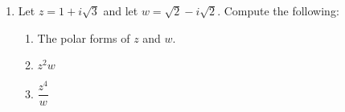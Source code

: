 \documentclass[12pt]{article}
\begin{document}
\begin{enumerate}
 \item Let $z = 1+i\sqrt{3}$ and let $w = \sqrt{2}-i\sqrt{2}$. Compute the following:
\begin{enumerate}
 \item The polar forms of $z$ and $w$.

\vspace{4cm}


 \item $z^2w$ 

\vspace{2.25cm}

 \item $\dfrac{z^4}{w}$

\vspace{2.25cm}



\end{enumerate}

 \end{enumerate}
\end{document}
